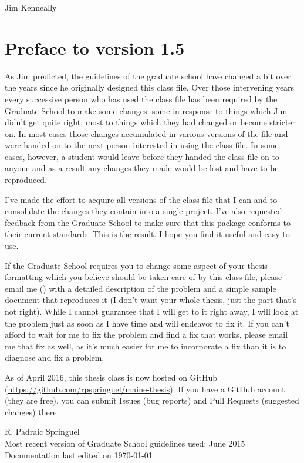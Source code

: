 \begin{preface}
 \begin{flushright}
 Jim Kenneally
 \end{flushright}
 
\section{Preface to version 1.5}
As Jim predicted, the guidelines of the graduate school have changed a bit over the years since he originally designed this class file.  Over those intervening years every successive person who has used the class file has been required by the Graduate School to make some changes: some in response to things which Jim didn't get quite right, most to things which they had changed or become stricter on.  In most cases those changes accumulated in various versions of the file and were handed on to the next person interested in using the class file.  In some cases, however, a student would leave before they handed the class file on to anyone and as a result any changes they made would be lost and have to be reproduced.

I've made the effort to acquire all versions of the class file that I can and to consolidate the changes they contain into a single project.  I've also requested feedback from the Graduate School to make sure that this package conforms to their current standards.  This is the result.  I hope you find it useful and easy to use.

If the Graduate School requires you to change some aspect of your thesis formatting which you believe should be taken care of by this class file, please email me (\email) with a detailed description of the problem and a simple sample document that reproduces it (I don't want your whole thesis, just the part that's not right).  While I cannot guarantee that I will get to it right away, I will look at the problem just as soon as I have time and will endeavor to fix it.  If you can't afford to wait for me to fix the problem and find a fix that works, please email me that fix as well, as it's much easier for me to incorporate a fix than it is to diagnose and fix a problem.

As of April 2016, this thesis class is now hosted on GitHub (\url{https://github.com/rpspringuel/maine-thesis}).  If you have a GitHub account (they are free), you can submit Issues (bug reports) and Pull Requests (suggested changes) there.

\begin{flushright}
R. Padraic Springuel\\
Most recent version of Graduate School guidelines used: June 2015\\
Documentation last edited on \today
\end{flushright}

\end{preface}


